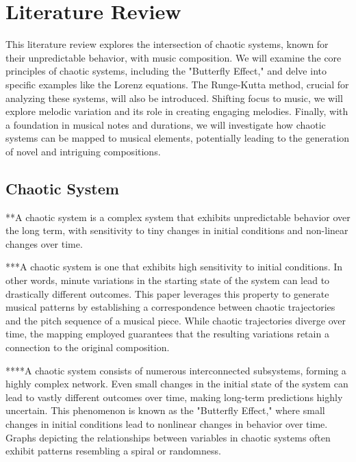 \documentclass[11pt]{article}
\theoremstyle{definition}
\begin{document}
\section{Literature Review}
\label{sec: literaturereview}
This literature review explores the intersection of chaotic systems, known for their unpredictable behavior, with music composition. We will examine the core principles of chaotic systems, including the "Butterfly Effect," and delve into specific examples like the Lorenz equations.  The Runge-Kutta method, crucial for analyzing these systems, will also be introduced.  Shifting focus to music, we will explore melodic variation and its role in creating engaging melodies.  Finally, with a foundation in musical notes and durations, we will investigate how chaotic systems can be mapped to musical elements, potentially leading to the generation of novel and intriguing compositions.

\subsection{Chaotic System}
**A chaotic system is a complex system that exhibits unpredictable behavior over the long term, with sensitivity to tiny changes in initial conditions and non-linear changes over time.


***A chaotic system is one that exhibits high sensitivity to initial conditions. In other words, minute variations in the starting state of the system can lead to drastically different outcomes. This paper leverages this property to generate musical patterns by establishing a correspondence between chaotic trajectories and the pitch sequence of a musical piece. While chaotic trajectories diverge over time, the mapping employed guarantees that the resulting variations retain a connection to the original composition.


****A chaotic system consists of numerous interconnected subsystems, forming a highly complex network. Even small changes in the initial state of the system can lead to vastly different outcomes over time, making long-term predictions highly uncertain. This phenomenon is known as the "Butterfly Effect," where small changes in initial conditions lead to nonlinear changes in behavior over time. Graphs depicting the relationships between variables in chaotic systems often exhibit patterns resembling a spiral or randomness.
\end{document}
